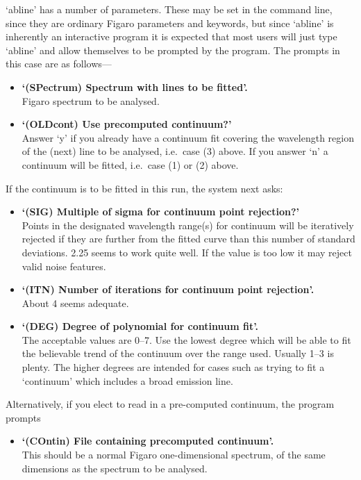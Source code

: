 \documentclass[11pt,twoside]{article}
\newcommand{\latorhtm}[2]{#1}
\newcommand{\latorhtm}[2]{#2}
\begin{document}
   `abline' has a number of parameters.  These may be set in the command
   line, since they are ordinary Figaro parameters and keywords, but
   since `abline' is inherently an interactive program it is expected
   that most users will just type `abline' and allow themselves to be
   prompted by the program.  The prompts in this case are as
   follows\latorhtm{---}{-}

\begin{itemize}
\item{\bf `(SPectrum) Spectrum with lines to be fitted'.}\ \\
   Figaro spectrum to be analysed.
\item{\bf `(OLDcont) Use precomputed continuum?'}\ \\
   Answer `y' if you already have a continuum fit covering the
   wavelength region of the (next) line to be analysed, i.e.\ case (3)
   above. If you answer `n' a continuum will be fitted, i.e.\ case (1) or
   (2) above.
\end{itemize}

   If the continuum is to be fitted in this run, the system next asks:

\begin{itemize}
\item{\bf `(SIG) Multiple of sigma for continuum point rejection?'}\ \\
   Points in the designated wavelength range(s) for continuum will be
   iteratively rejected if they are further from the fitted curve than
   this number of standard deviations. 2.25 seems to work quite well. If
   the value is too low it may reject valid noise features.
\item{\bf `(ITN) Number of iterations for continuum point rejection'.}\ \\
   About 4 seems adequate.
\item{\bf `(DEG) Degree of polynomial for continuum fit'.}\ \\
   The acceptable values are 0\latorhtm{--}{-}7. Use the lowest degree which
   will be
   able to fit the believable trend of the continuum over the range
   used. Usually 1\latorhtm{--}{-}3 is plenty. The higher degrees are
   intended for
   cases such as trying to fit a `continuum' which includes a broad
   emission line.
\end{itemize}

   Alternatively, if you elect to read in a pre-computed continuum, the
   program prompts

\begin{itemize}
\item{\bf `(COntin) File containing precomputed continuum'.}\ \\
   This should be a normal Figaro one-dimensional spectrum, of the same
   dimensions as the spectrum to be analysed.
\end{itemize}
\end{document}
